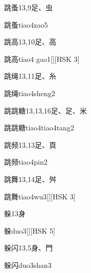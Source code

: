 \begin{entry}{跳蚤}{13,9}{⾜、⾍}
  \begin{phonetics}{跳蚤}{tiao4zao5}
  \end{phonetics}
\end{entry}

\begin{entry}{跳高}{13,10}{⾜、⾼}
  \begin{phonetics}{跳高}{tiao4 gao1}[][HSK 3]
  \end{phonetics}
\end{entry}

\begin{entry}{跳绳}{13,11}{⾜、⽷}
  \begin{phonetics}{跳绳}{tiao4sheng2}
  \end{phonetics}
\end{entry}

\begin{entry}{跳跳糖}{13,13,16}{⾜、⾜、⽶}
  \begin{phonetics}{跳跳糖}{tiao4tiao4tang2}
  \end{phonetics}
\end{entry}

\begin{entry}{跳频}{13,13}{⾜、⾴}
  \begin{phonetics}{跳频}{tiao4pin2}
  \end{phonetics}
\end{entry}

\begin{entry}{跳舞}{13,14}{⾜、⾇}
  \begin{phonetics}{跳舞}{tiao4wu3}[][HSK 3]
  \end{phonetics}
\end{entry}

\begin{entry}{躲}{13}{⾝}
  \begin{phonetics}{躲}{duo3}[][HSK 5]
  \end{phonetics}
\end{entry}

\begin{entry}{躲闪}{13,5}{⾝、⾨}
  \begin{phonetics}{躲闪}{duo3shan3}
  \end{phonetics}
\end{entry}


